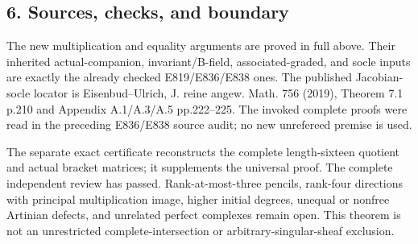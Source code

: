 \subsection{6. Sources, checks, and
boundary}\label{SF-E840:sources-checks-and-boundary}

The new multiplication and equality arguments are proved in full above.
Their inherited actual-companion, invariant/B-field, associated-graded,
and socle inputs are exactly the already checked E819/E836/E838 ones.
The published Jacobian-socle locator is Eisenbud--Ulrich, J. reine
angew. Math. 756 (2019), Theorem 7.1 p.210 and Appendix A.1/A.3/A.5
pp.222--225.\cite{SFEisenbudUlrich2019} The invoked complete proofs were read in the preceding
E836/E838 source audit; no new unrefereed premise is used.

The separate exact certificate reconstructs the complete length-sixteen
quotient and actual bracket matrices; it supplements the universal
proof. The complete independent review has passed. Rank-at-most-three pencils,
rank-four directions with principal multiplication image, higher initial
degrees, unequal or nonfree Artinian defects, and unrelated perfect
complexes remain open. This theorem is not an unrestricted
complete-intersection or arbitrary-singular-sheaf exclusion.
